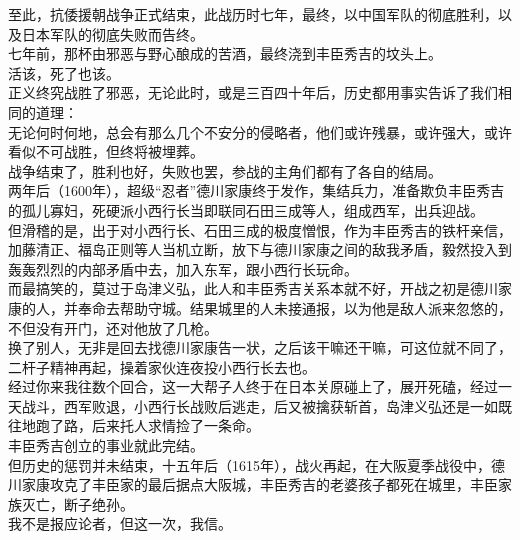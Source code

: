 \begin{multicols}{\theparacolNo}
至此，抗倭援朝战争正式结束，此战历时七年，最终，以中国军队的彻底胜利，以及日本军队的彻底失败而告终。\\

七年前，那杯由邪恶与野心酿成的苦酒，最终浇到丰臣秀吉的坟头上。\\

活该，死了也该。\\

正义终究战胜了邪恶，无论此时，或是三百四十年后，历史都用事实告诉了我们相同的道理：\\

无论何时何地，总会有那么几个不安分的侵略者，他们或许残暴，或许强大，或许看似不可战胜，但终将被埋葬。\\

战争结束了，胜利也好，失败也罢，参战的主角们都有了各自的结局。\\

两年后（1600年），超级“忍者”德川家康终于发作，集结兵力，准备欺负丰臣秀吉的孤儿寡妇，死硬派小西行长当即联同石田三成等人，组成西军，出兵迎战。\\

但滑稽的是，出于对小西行长、石田三成的极度憎恨，作为丰臣秀吉的铁杆亲信，加藤清正、福岛正则等人当机立断，放下与德川家康之间的敌我矛盾，毅然投入到轰轰烈烈的内部矛盾中去，加入东军，跟小西行长玩命。\\

而最搞笑的，莫过于岛津义弘，此人和丰臣秀吉关系本就不好，开战之初是德川家康的人，并奉命去帮助守城。结果城里的人未接通报，以为他是敌人派来忽悠的，不但没有开门，还对他放了几枪。\\

换了别人，无非是回去找德川家康告一状，之后该干嘛还干嘛，可这位就不同了，二杆子精神再起，操着家伙连夜投小西行长去也。\\

经过你来我往数个回合，这一大帮子人终于在日本关原碰上了，展开死磕，经过一天战斗，西军败退，小西行长战败后逃走，后又被擒获斩首，岛津义弘还是一如既往地跑了路，后来托人求情捡了一条命。\\

丰臣秀吉创立的事业就此完结。\\

但历史的惩罚并未结束，十五年后（1615年），战火再起，在大阪夏季战役中，德川家康攻克了丰臣家的最后据点大阪城，丰臣秀吉的老婆孩子都死在城里，丰臣家族灭亡，断子绝孙。\\

我不是报应论者，但这一次，我信。\\


\end{multicols}
